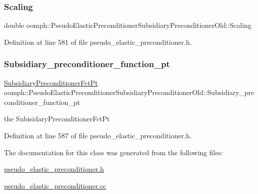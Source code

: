 \subsubsection{\texorpdfstring{Scaling}{Scaling}}
{\footnotesize\ttfamily double oomph\+::\+Pseudo\+Elastic\+Preconditioner\+Subsidiary\+Preconditioner\+Old\+::\+Scaling\hspace{0.3cm}{\ttfamily [private]}}



Definition at line 581 of file pseudo\+\_\+elastic\+\_\+preconditioner.\+h.

\mbox{\label{classoomph_1_1PseudoElasticPreconditionerSubsidiaryPreconditionerOld_a15876ef914c08070cc025f3b6696e4e1}} 
\subsubsection{\texorpdfstring{Subsidiary\+\_\+preconditioner\+\_\+function\+\_\+pt}{Subsidiary\_preconditioner\_function\_pt}}
{\footnotesize\ttfamily \hyperlink{classoomph_1_1PseudoElasticPreconditionerSubsidiaryPreconditionerOld_a2ee5b7ddad26a4eb6662e2b701ab0a52}{Subsidiary\+Preconditioner\+Fct\+Pt} oomph\+::\+Pseudo\+Elastic\+Preconditioner\+Subsidiary\+Preconditioner\+Old\+::\+Subsidiary\+\_\+preconditioner\+\_\+function\+\_\+pt\hspace{0.3cm}{\ttfamily [private]}}



the Subisidary\+Preconditioner\+Fct\+Pt 



Definition at line 587 of file pseudo\+\_\+elastic\+\_\+preconditioner.\+h.



The documentation for this class was generated from the following files\+:\begin{DoxyCompactItemize}
\item 
\hyperlink{pseudo__elastic__preconditioner_8h}{pseudo\+\_\+elastic\+\_\+preconditioner.\+h}\item 
\hyperlink{pseudo__elastic__preconditioner_8cc}{pseudo\+\_\+elastic\+\_\+preconditioner.\+cc}\end{DoxyCompactItemize}
